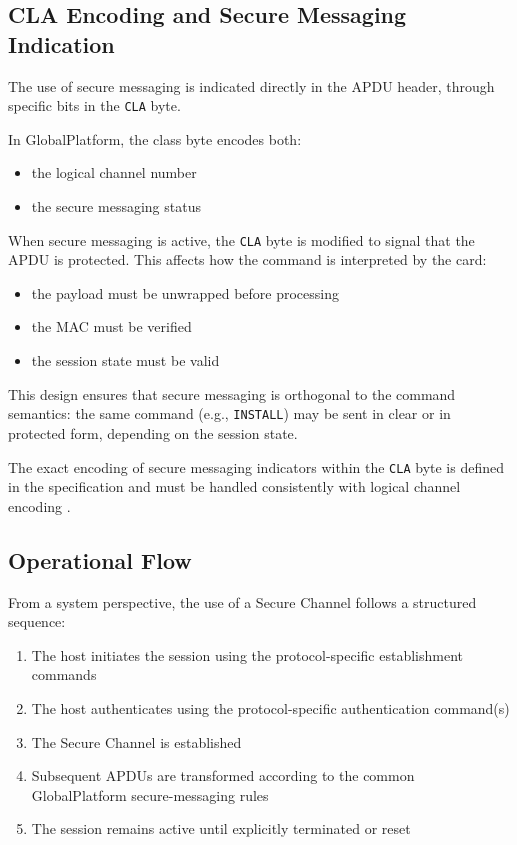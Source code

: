 \subsection{CLA Encoding and Secure Messaging Indication}

The use of secure messaging is indicated directly in the APDU header, through
specific bits in the \texttt{CLA} byte.

In GlobalPlatform, the class byte encodes both:
\begin{itemize}
\item the logical channel number
\item the secure messaging status
\end{itemize}

When secure messaging is active, the \texttt{CLA} byte is modified to signal
that the APDU is protected. This affects how the command is interpreted by the
card:
\begin{itemize}
\item the payload must be unwrapped before processing
\item the MAC must be verified
\item the session state must be valid
\end{itemize}

This design ensures that secure messaging is orthogonal to the command
semantics: the same command (e.g., \texttt{INSTALL}) may be sent in clear or in
protected form, depending on the session state.

The exact encoding of secure messaging indicators within the \texttt{CLA} byte
is defined in the specification and must be handled consistently with logical
channel encoding  .

\subsection{Operational Flow}

From a system perspective, the use of a Secure Channel follows a structured
sequence:

\begin{enumerate}
\item The host initiates the session using the protocol-specific establishment
      commands
\item The host authenticates using the protocol-specific authentication
      command(s)
\item The Secure Channel is established
\item Subsequent APDUs are transformed according to the common GlobalPlatform
      secure-messaging rules
\item The session remains active until explicitly terminated or reset
\end{enumerate}

